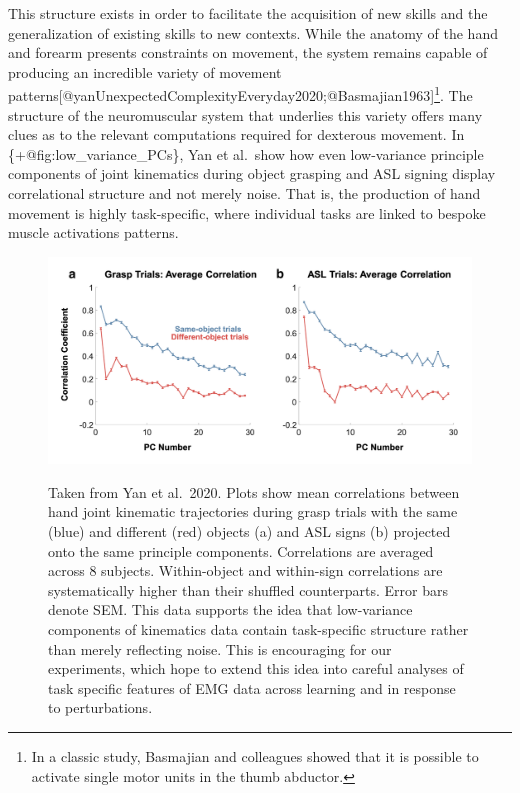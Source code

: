 \documentclass[../main.tex]{subfiles}
\begin{document}
{{{This structure exists in order to facilitate the acquisition of new
skills and the generalization of existing skills to new contexts. While
the anatomy of the hand and forearm presents constraints on movement,
the system remains capable of producing an incredible variety of
movement
patterns{[}@yanUnexpectedComplexityEveryday2020;@Basmajian1963{]}\footnote{In
  a classic study, Basmajian and colleagues showed that it is possible
  to activate single motor units in the thumb abductor.}. The structure
of the neuromuscular system that underlies this variety offers many
clues as to the relevant computations required for dexterous movement.
In \{+@fig:low\_variance\_PCs\}, Yan et al.~show how even low-variance
principle components of joint kinematics during object grasping and ASL
signing display correlational structure and not merely noise. That is,
the production of hand movement is highly task-specific, where
individual tasks are linked to bespoke muscle activations patterns.

\begin{figure}
\label{fig:low_variance_PCs}
\centering
\includegraphics[width=1\textwidth,height=\textheight]{../images/physiology/background/low_variance_PCs.png}
\caption{Taken from Yan et al.~2020. Plots show mean correlations
between hand joint kinematic trajectories during grasp trials with the
same (blue) and different (red) objects (a) and ASL signs (b) projected
onto the same principle components. Correlations are averaged across 8
subjects. Within-object and within-sign correlations are systematically
higher than their shuffled counterparts. Error bars denote SEM. This
data supports the idea that low-variance components of kinematics data
contain task-specific structure rather than merely reflecting noise.
This is encouraging for our experiments, which hope to extend this idea
into careful analyses of task specific features of EMG data across
learning and in response to perturbations.}\label{fig:low_variance_PCs}
\end{figure}

}}}
\end{document}

